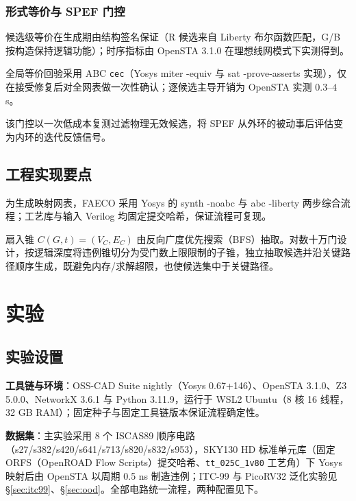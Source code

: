 \documentclass[journal]{IEEEtran}
\begin{document}
\subsubsection{形式等价与 SPEF 门控}
候选级等价在生成期由结构签名保证（R 候选来自 Liberty 布尔函数匹配，G/B 按构造保持逻辑功能）；时序指标由 OpenSTA 3.1.0 在理想线网模式下实测得到。

全局等价回验采用 ABC \texttt{cec}（Yosys miter -equiv 与 sat -prove-asserts 实现），仅在接受修复后对全网表做一次性确认；逐候选主导开销为 OpenSTA 实测 $0.3$--$4\,$s。

该门控以一次低成本复测过滤物理无效候选，将 SPEF 从外环的被动事后评估变为内环的迭代反馈信号。

\subsection{工程实现要点}\label{sec:impl}

为生成映射网表，FAECO 采用 Yosys 的 synth -noabc 与 abc -liberty 两步综合流程；工艺库与输入 Verilog 均固定提交哈希，保证流程可复现。

扇入锥 $C(G, t) = (V_C, E_C)$ 由反向广度优先搜索（BFS）抽取。对数十万门设计，按逻辑深度将违例锥切分为受门数上限限制的子锥，独立抽取候选并沿关键路径顺序生成，既避免内存/求解超限，也使候选集中于关键路径。

\section{实验}\label{sec:exp}

\subsection{实验设置}\label{sec:setup}

\textbf{工具链与环境}：OSS-CAD Suite nightly（Yosys 0.67+146）、OpenSTA 3.1.0、Z3 5.0.0、NetworkX 3.6.1 与 Python 3.11.9，运行于 WSL2 Ubuntu（8 核 16 线程，32 GB RAM）；固定种子与固定工具链版本保证流程确定性。

\textbf{数据集}：主实验采用 8 个 ISCAS89 顺序电路（s27/s382/s420/s641/s713/s820/s832/s953），SKY130 HD 标准单元库（固定 ORFS（OpenROAD Flow Scripts）提交哈希、\texttt{tt\_025C\_1v80} 工艺角）下 Yosys 映射后由 OpenSTA 以周期 0.5 ns 制造违例；ITC-99 与 PicoRV32 泛化实验见 \S\ref{sec:itc99}、\S\ref{sec:ood}。全部电路统一流程，两种配置见下。
\end{document}
